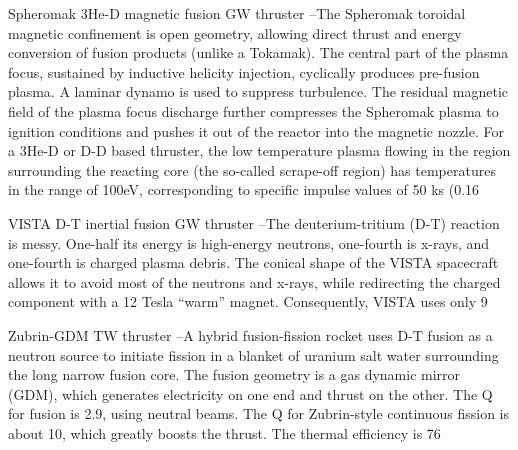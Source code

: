 \documentclass[a4paper]{book}
\begin{document}
Spheromak 3He-D magnetic fusion GW thruster –The Spheromak toroidal magnetic confinement is open geometry, allowing direct thrust and energy conversion of fusion products (unlike a Tokamak). The central part of the plasma focus, sustained by inductive helicity injection, cyclically produces pre-fusion plasma. A laminar dynamo is used to suppress turbulence. The residual magnetic field of the plasma focus discharge further compresses the Spheromak plasma to ignition conditions and pushes it out of the reactor into the magnetic nozzle. For a 3He-D or D-D based thruster, the low temperature plasma flowing in the region surrounding the reacting core (the so-called scrape-off region) has temperatures in the range of 100eV, corresponding to specific impulse values of 50 ks (0.16%
 
VISTA D-T inertial fusion GW thruster –The deuterium-tritium (D-T) reaction is messy. One-half its energy is high-energy neutrons, one-fourth is x-rays, and one-fourth is charged plasma debris. The conical shape of the VISTA spacecraft allows it to avoid most of the neutrons and x-rays, while redirecting the charged component with a 12 Tesla “warm” magnet. Consequently, VISTA uses only 9%
 
Zubrin-GDM TW thruster –A hybrid fusion-fission rocket uses D-T fusion as a neutron source to initiate fission in a blanket of uranium salt water surrounding the long narrow fusion core.  The fusion geometry is a gas dynamic mirror (GDM), which generates electricity on one end and thrust on the other.  The Q for fusion is 2.9, using neutral beams.  The Q for Zubrin-style continuous fission is about 10, which greatly boosts the thrust. The thermal efficiency is 76%
\end{document}
